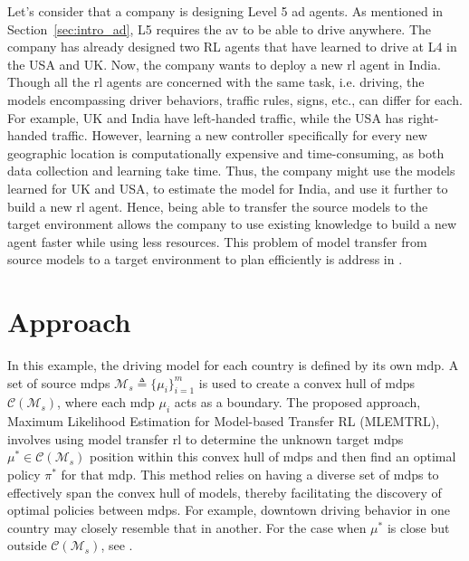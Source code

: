 Let's consider that a company is designing Level 5 \gls{ad} agents. As mentioned in Section~\ref{sec:intro_ad}, L5 requires the \gls{av} to be able to drive anywhere. The company has already designed two RL agents that have learned to drive at L4 in the USA and UK. Now, the company wants to deploy a new \gls{rl} agent in India. 
Though all the \gls{rl} agents are concerned with the same task, i.e. driving, the models encompassing driver behaviors, traffic rules, signs, etc., can differ for each. For example, UK and India have left-handed traffic, while the USA has right-handed traffic. However, learning a new controller specifically for every new geographic location is computationally expensive and time-consuming, as both data collection and learning take time. Thus, the company might use the models learned for UK and USA, to estimate the model for India, and use it further to build a new \gls{rl} agent. Hence, being able to transfer the source models to the target environment allows the company to use existing knowledge to build a new agent faster while using less resources. 
This problem of model transfer from source models to a target environment to plan efficiently is address in \paperTransfer. 

\section{Approach}
In this example, the driving model for each country is defined by its own \gls{mdp}. A set of source \gls{mdp}s $\mathcal{M}_s \triangleq \{\mu_i\}_{i=1}^m$ is used to create a convex hull of \gls{mdp}s $\mathcal{C}(\mathcal{M}_s)$, where each \gls{mdp} $\mu_i$ acts as a boundary. 
The proposed approach, Maximum Likelihood Estimation for Model-based Transfer RL (MLEMTRL), involves using model transfer \gls{rl} to determine the unknown target \gls{mdp}s $\mu^* \in \mathcal{C}(\mathcal{M}_s)$ position within this convex hull of \gls{mdp}s and then find an optimal policy $\pi^*$ for that \gls{mdp}. 
This method relies on having a diverse set of \gls{mdp}s to effectively span the convex hull of models, thereby facilitating the discovery of optimal policies between \gls{mdp}s. For example, downtown driving behavior in one country may closely resemble that in another. For the case when $\mu^*$ is close but outside $\mathcal{C}(\mathcal{M}_s)$, see \paperTransfer.



